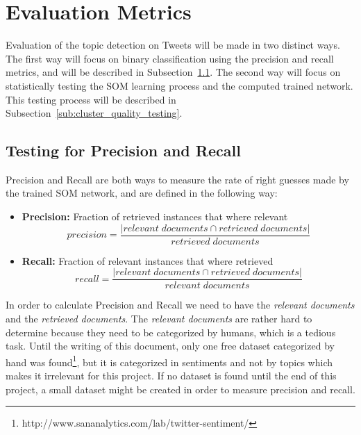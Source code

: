 
\section{Evaluation Metrics} %
\label{sec:evaluation_metrics}
Evaluation of the topic detection on Tweets will be made in two distinct ways. The first way will focus on  binary classification using the precision and recall metrics, and will be described in Subsection~\ref{sub:testing_for_precision_and_recall}. The second way will focus on statistically testing the SOM learning process and the computed trained network. This testing process will be described in Subsection~\ref{sub:cluster_quality_testing}. 

\subsection{Testing for Precision and Recall} %

\label{sub:testing_for_precision_and_recall}
Precision and Recall are both ways to measure the rate of right guesses made by the trained SOM network, and are defined in the following way:
\begin{itemize}
  \item \textbf{Precision:} Fraction of retrieved instances that where relevant 
    \begin{equation}
      precision = \frac{|{relevant\;documents}\cap{retrieved\;documents}|}{{retrieved\;documents}}
    \end{equation} 
  \item \textbf{Recall:} Fraction of relevant instances that where retrieved
   \begin{equation}
      recall = \frac{|{relevant\;documents}\cap{retrieved\;documents}|}{{relevant\;documents}} 
    \end{equation} 
\end{itemize}

In order to calculate Precision and Recall we need to have the \emph{relevant documents} and the \emph{retrieved documents}. The \emph{relevant documents} are rather hard to determine because they need to be categorized by humans, which is a tedious task. Until the writing of this document, only one free dataset categorized by hand was found\footnote{http://www.sananalytics.com/lab/twitter-sentiment/}, but it is categorized in sentiments and not by topics which makes it irrelevant for this project. If no dataset is found until the end of this project, a small dataset might be created in order to measure precision and recall.

